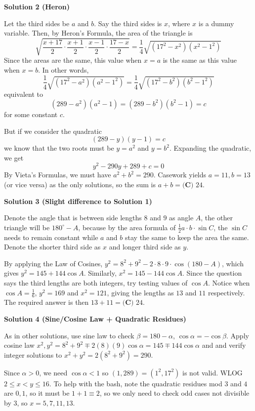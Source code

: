 \begin{enumerate}
 



\textbf{Solution 2 (Heron)}

Let the third sides be $a$ and $b$. Say the third sides is $x$, where $x$ is a dummy variable. Then, by Heron’s Formula, the area of the triangle is
 \[\sqrt{\frac{x+17}{2}\cdot\frac{x+1}{2}\cdot\frac{x-1}{2}\cdot\frac{17-x}{2}}=\frac{1}{4}\sqrt{(17^2-x^2)(x^2-1^2)}\]Since the areas are the same, this value when $x=a$ is the same as this value when $x=b$. In other words,
 \[\frac{1}{4}\sqrt{(17^2-a^2)(a^2-1^2)}=\frac{1}{4}\sqrt{(17^2-b^2)(b^2-1^2)}\]equivalent to
 \[(289-a^2)(a^2-1)=(289-b^2)(b^2-1)=c\]for some constant $c$.

 But if we consider the quadratic
 \[(289-y)(y-1)=c\]we know that the two roots must be $y=a^2$ and $y=b^2$. Expanding the quadratic, we get
 \[y^2-290y+289+c=0\]By Vieta’s Formulas, we must have $a^2+b^2=290$. Casework yields $a=11,b=13$ (or vice versa) as the only solutions, so the sum is $a+b=\boxed{\textbf{(C) } 24}$.

 



\textbf{Solution 3 (Slight difference to Solution 1)}

Denote the angle that is between side lengths $8$ and $9$ as angle $A$, the other triangle will be $180^\circ - A$, because by the area formula of $\frac{1}{2}a\cdot b\cdot\sin C$, the $\sin C$ needs to remain constant while $a$ and $b$ stay the same to keep the area the same. Denote the shorter third side as $x$ and longer third side as $y$.

 By applying the Law of Cosines, $y^2 = 8^2 + 9^2 - 2 \cdot 8 \cdot 9 \cdot \cos(180- A)$, which gives $y^2 = 145 + 144\cos A$. Similarly, $x^2 = 145 - 144\cos A$. Since the question says the third lengths are both integers, try testing values of $\cos A$. Notice when $\cos A = \frac{1}{6}$, $y^2 = 169$ and $x^2 = 121$, giving the lengths as $13$ and $11$ respectively. The required answer is then $13 + 11 = \boxed{\textbf{(C) } 24}$.

 



\textbf{Solution 4 (Sine/Cosine Law + Quadratic Residues)}

As in other solutions, use sine law to check $\beta=180-\alpha$, $\cos\alpha=-\cos\beta$. Apply cosine law $x^2,y^2=8^2+9^2\mp 2(8)(9)\cos\alpha=145\mp 144\cos\alpha$ and and verify integer solutions to $x^2+y^2=2(8^2+9^2)=290$.

 Since $\alpha>0$, we need $\cos\alpha<1$ so $(1,289)=(1^2,17^2)$ is not valid. WLOG $2\le x<y\le 16$. To help with the bash, note the quadratic residues mod $3$ and $4$ are $0,1$, so it must be $1+1\equiv 2$, so we only need to check odd cases not divisible by $3$, so $x=5,7,11,13$.


\end{enumerate}
